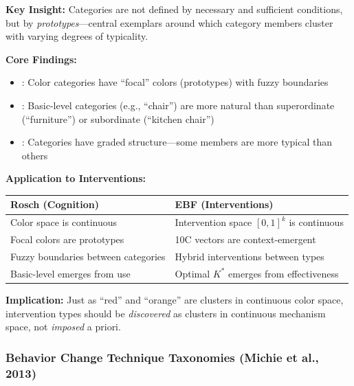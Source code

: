 \begin{tcolorbox}[colback=blue!5!white, colframe=blue!50!black,
    title=\textbf{Critical Foundation ($\phi$): Rosch's Prototype Theory}]

\textbf{Key Insight:} Categories are not defined by necessary and sufficient conditions, but by \textit{prototypes}---central exemplars around which category members cluster with varying degrees of typicality.

\textbf{Core Findings:}
\begin{itemize}[nosep]
    \item \citet{rosch1973natural}: Color categories have ``focal'' colors (prototypes) with fuzzy boundaries
    \item \citet{rosch1975cognitive}: Basic-level categories (e.g., ``chair'') are more natural than superordinate (``furniture'') or subordinate (``kitchen chair'')
    \item \citet{rosch1978principles}: Categories have graded structure---some members are more typical than others
\end{itemize}

\textbf{Application to Interventions:}
\begin{center}
\begin{tabular}{p{5cm}p{6cm}}
\toprule
\textbf{Rosch (Cognition)} & \textbf{EBF (Interventions)} \\
\midrule
Color space is continuous & Intervention space $[0,1]^k$ is continuous \\
Focal colors are prototypes & 10C vectors are context-emergent \\
Fuzzy boundaries between categories & Hybrid interventions between types \\
Basic-level emerges from use & Optimal $K^*$ emerges from effectiveness \\
\bottomrule
\end{tabular}
\end{center}

\textbf{Implication:} Just as ``red'' and ``orange'' are clusters in continuous color space, intervention types should be \textit{discovered} as clusters in continuous mechanism space, not \textit{imposed} a priori.

\end{tcolorbox}

\subsubsection{Behavior Change Technique Taxonomies (Michie et al., 2013)}

